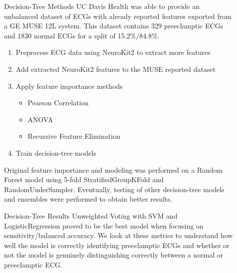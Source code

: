\documentclass[final]{beamer}
\newlength{\sepwidth}
\newlength{\colwidth}
\newcommand{\separatorcolumn}{\begin{column}{\sepwidth}\end{column}}
\begin{document}
\begin{frame}[t]
\begin{columns}[t]
\begin{column}{\colwidth}
\end{column}

\separatorcolumn

\begin{column}{\colwidth}

  \begin{block}{Decision-Tree Methods}
    UC Davis Health was able to provide an unbalanced dataset of ECGs with already reported features exported from a GE MUSE 12L system. This dataset contains 329 preeclamptic ECGs and 1830 normal ECGs for a split of 15.2\%/84.8\%.

    \begin{enumerate}
      \item Preprocess ECG data using NeuroKit2 to extract more features
      \item Add extracted NeuroKit2 features to the MUSE reported dataset
      \item Apply feature importance methods
      \begin{itemize}
        \item Pearson Correlation
        \item ANOVA
        \item Recursive Feature Elimination
      \end{itemize}
      \item Train decision-tree models
    \end{enumerate}

    Original feature importance and modeling was performed on a Random Forest model using 5-fold StratifiedGroupKFold and RandomUnderSampler. Eventually, testing of other decision-tree models and ensembles were performed to obtain better results.
  \end{block}

  \begin{block}{Decision-Tree Results}
    Unweighted Voting with SVM and LogisticRegression proved to be the best model when focusing on sensitivity/balanced accuracy. We look at these metrics to understand how well the model is correctly identifying preeclamptic ECGs and whether or not the model is genuinely distinguishing correctly between a normal or preeclamptic ECG.


\end{block}
\end{column}
\end{columns}
\end{frame}
\end{document}
